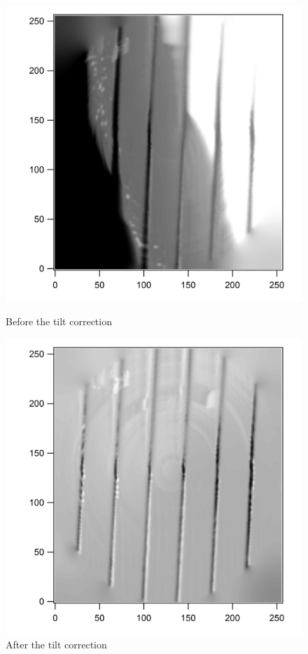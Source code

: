 \begin{figure}[ht]
\begin{minipage}[b]{0.45\linewidth}
\centering
\includegraphics[width=\textwidth]{images/TiltSession0226_27.png}
\caption{Before the tilt correction}
\label{tiltbefore}
\end{minipage}
\hspace{0.5cm}
\begin{minipage}[b]{0.45\linewidth}
\centering
\includegraphics[width=\textwidth]{images/TiltSession0226wc_35.png}
\caption{After the tilt correction}
\label{tiltafter}
\end{minipage}
\end{figure}

